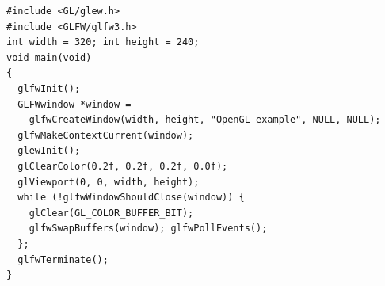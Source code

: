 \documentclass[calcdimensions,landscape,letterpaper]{powersem}
\newcommand{\thecurrentheading}{}
\newcommand{\heading}[1]{\renewcommand{\thecurrentheading}{#1}}
\begin{document}
\begin{slide}
    \heading{Getting Started: GLFW Window}
    \begin{center}
        \begin{minipage}[c]{.98\textwidth}
            \begin{verbatim}
#include <GL/glew.h>
#include <GLFW/glfw3.h>
int width = 320; int height = 240;
void main(void)
{
  glfwInit();
  GLFWwindow *window =
    glfwCreateWindow(width, height, "OpenGL example", NULL, NULL);
  glfwMakeContextCurrent(window);
  glewInit();
  glClearColor(0.2f, 0.2f, 0.2f, 0.0f);
  glViewport(0, 0, width, height);
  while (!glfwWindowShouldClose(window)) {
    glClear(GL_COLOR_BUFFER_BIT);
    glfwSwapBuffers(window); glfwPollEvents();
  };
  glfwTerminate();
}
            \end{verbatim}
        \end{minipage}
    \end{center}
\end{slide}

\begin{slide}
    \heading{Getting Started: Result}
    \begin{center}
    \end{center}
\end{slide}
\end{document}
